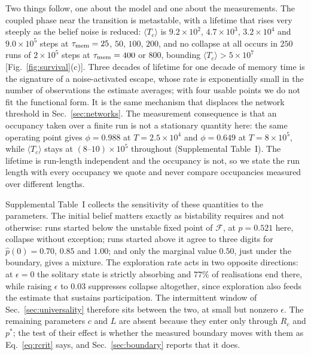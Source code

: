 \documentclass[aps,pre,twocolumn,superscriptaddress,floatfix,longbibliography]{revtex4-2}
\begin{document}
Two things follow, one about the model and one about the measurements. The
coupled phase near the transition is metastable, with a lifetime that rises very
steeply as the belief noise is reduced: $\langle T_c\rangle$ is
$9.2\times10^{2}$, $4.7\times10^{3}$, $3.2\times10^{4}$ and $9.0\times10^{5}$
steps at $\tau_{\rm mem}=25$, $50$, $100$, $200$, and no collapse at all occurs
in $250$ runs of $2\times10^{5}$ steps at $\tau_{\rm mem}=400$ or $800$, bounding
$\langle T_c\rangle>5\times10^{7}$ [Fig.~\ref{fig:survival}(c)]. Three decades of
lifetime for one decade of memory time is the signature of a noise-activated
escape, whose rate is exponentially small in the number of observations the
estimate averages; with four usable points we do not fit the functional form. It
is the same mechanism that displaces the network threshold in
Sec.~\ref{sec:networks}. The measurement consequence is that an occupancy taken
over a finite run is not a stationary quantity here: the same operating point
gives $\phi=0.988$ at $T=2.5\times10^{4}$ and $\phi=0.649$ at $T=8\times10^{5}$,
while $\langle T_c\rangle$ stays at $(8\text{--}10)\times10^{5}$ throughout
(Supplemental Table~I). The lifetime is run-length independent and the occupancy is not,
so we state the run length with every occupancy we quote and never compare
occupancies measured over different lengths.

Supplemental Table~I collects the sensitivity of these quantities to the parameters.
The initial belief matters exactly as bistability requires and not otherwise:
runs started below the unstable fixed point of $\mathcal{F}$, at $p=0.521$ here,
collapse without exception; runs started above it agree to three digits for
$\hat p(0)=0.70$, $0.85$ and $1.00$; and only the marginal value $0.50$, just
under the boundary, gives a mixture. The exploration rate acts in two opposite
directions: at $\epsilon=0$ the solitary state is strictly absorbing and $77\%$
of realisations end there, while raising $\epsilon$ to $0.03$ suppresses collapse
altogether, since exploration also feeds the estimate that sustains
participation. The intermittent window of Sec.~\ref{sec:universality} therefore
sits between the two, at small but nonzero $\epsilon$. The remaining parameters
$c$ and $L$ are absent because they enter only through $R_c$ and $p^{*}$; the
test of their effect is whether the measured boundary moves with them as
Eq.~\eqref{eq:rcrit} says, and Sec.~\ref{sec:boundary} reports that it does.
\end{document}

